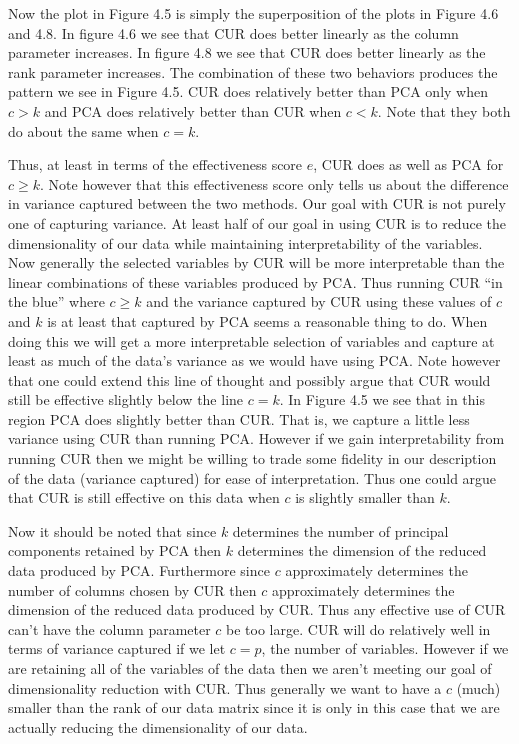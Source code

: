 \documentclass{book}
\begin{document}
Now the plot in Figure 4.5 is simply the superposition of the plots in Figure 4.6 and 4.8. In figure 4.6 we see that CUR does better linearly as the column parameter increases. In figure 4.8 we see that CUR does better linearly as the rank parameter increases. The combination of these two behaviors produces the pattern we see in Figure 4.5. CUR does relatively better than PCA only when $c>k$ and PCA does relatively better than CUR when $c<k$. Note that they both do about the same when $c=k$. 

Thus, at least in terms of the effectiveness score $e$, CUR does as well as PCA for $c \geq k$. Note however that this effectiveness score only tells us about the difference in variance captured between the two methods. Our goal with CUR is not purely one of capturing variance.  At least half of our goal in using CUR is to reduce the dimensionality of our data while maintaining interpretability of the variables. Now generally the selected variables by CUR will be more interpretable than the linear combinations of these variables produced by PCA. Thus running CUR ``in the blue'' where $c \geq k$ and the variance captured by CUR using these values of $c$ and $k$ is at least that captured by PCA seems a reasonable thing to do. When doing this we will get a more interpretable selection of variables and capture at least as much of the data's variance as we would have using PCA. Note however that one could extend this line of thought and possibly argue that CUR would still be effective slightly below the line $c=k$. In Figure 4.5 we see that in this region PCA does slightly better than CUR. That is, we capture a little less variance using CUR than running PCA. However if we gain interpretability from running CUR then we might be willing to trade some fidelity in our description of the data (variance captured) for ease of interpretation. Thus one could argue that CUR is still effective on this data when $c$ is slightly smaller than $k$. 

Now it should be noted that since $k$ determines the number of principal components retained by PCA then $k$ determines the dimension of the reduced data produced by PCA. Furthermore since $c$ approximately determines the number of columns chosen by CUR then $c$ approximately determines the dimension of the reduced data produced by CUR. Thus any effective use of CUR can't have the column parameter $c$ be too large. CUR will do relatively well in terms of variance captured if we let $c=p$, the number of variables. However if we are retaining all of the variables of the data then we aren't meeting our goal of dimensionality reduction with CUR. Thus generally we want to have a $c$ (much) smaller than the rank of our data matrix since it is only in this case that we are actually reducing the dimensionality of our data. 
\end{document}
